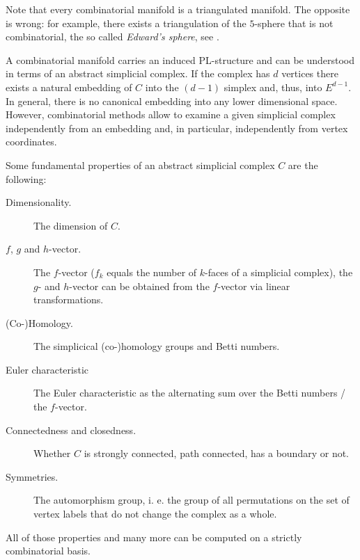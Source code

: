 \documentclass[a4paper,11pt]{report}
\begin{document}
{{ Note that every combinatorial manifold is a triangulated manifold. The
opposite is wrong: for example, there exists a triangulation of the $5$-sphere that is not combinatorial, the so called \emph{Edward's sphere}, see \cite{Bjoerner00SimplMnfBistellarFlips}. 

 A combinatorial manifold carries an induced PL-structure and can be understood
in terms of an abstract simplicial complex. If the complex has $d$ vertices there exists a natural embedding of $C$ into the $(d-1)$ simplex and, thus, into $E^{d-1}$. In general, there is no canonical embedding into any lower dimensional
space. However, combinatorial methods allow to examine a given simplicial
complex independently from an embedding and, in particular, independently from
vertex coordinates. 

 Some fundamental properties of an abstract simplicial complex $C$ are the following: 
\begin{description}
\item[{Dimensionality.}] The dimension of $C$.
\item[{$f$, $g$ and $h$-vector.}]  The $f$-vector ($f_k$ equals the number of $k$-faces of a simplicial complex), the $g$- and $h$-vector can be obtained from the $f$-vector via linear transformations.
\item[{(Co-)Homology.}] The simplicical (co-)homology groups and Betti numbers.
\item[{Euler characteristic}] The Euler characteristic as the alternating sum over the Betti numbers / the $f$-vector.
\item[{Connectedness and closedness.}] Whether $C$ is strongly connected, path connected, has a boundary or not.
\item[{Symmetries.}] The automorphism group, i. e. the group of all permutations on the set of
vertex labels that do not change the complex as a whole.
\end{description}
 

 All of those properties and many more can be computed on a strictly
combinatorial basis. }


}
\end{document}
